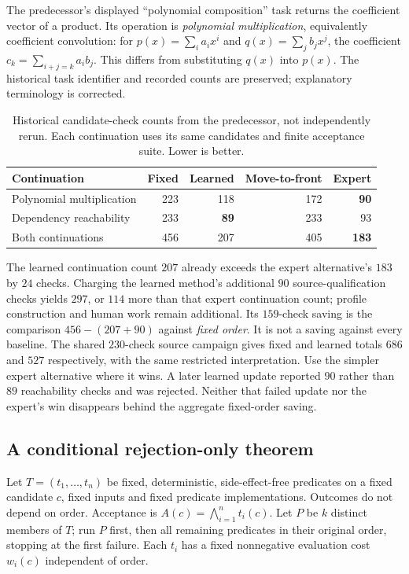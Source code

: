 \documentclass[11pt,letterpaper]{article}
\begin{document}
The predecessor's displayed ``polynomial composition'' task returns the coefficient vector of a product. Its operation is \emph{polynomial multiplication}, equivalently coefficient convolution: for $p(x)=\sum_i a_i x^i$ and $q(x)=\sum_j b_jx^j$, the coefficient $c_k=\sum_{i+j=k}a_i b_j$. This differs from substituting $q(x)$ into $p(x)$. The historical task identifier and recorded counts are preserved; explanatory terminology is corrected.

\begin{table}[htbp]\centering\small
\caption{Historical candidate-check counts from the predecessor, not independently rerun. Each continuation uses its same candidates and finite acceptance suite. Lower is better.}
\begin{tabularx}{\linewidth}{@{}Xrrrr@{}}\toprule
Continuation & Fixed & Learned & Move-to-front & Expert\\\midrule
Polynomial multiplication & 223 & 118 & 172 & \textbf{90}\\
Dependency reachability & 233 & \textbf{89} & 233 & 93\\\midrule
Both continuations & 456 & 207 & 405 & \textbf{183}\\\bottomrule
\end{tabularx}
\end{table}
The learned continuation count $207$ already exceeds the expert alternative's $183$ by $24$ checks. Charging the learned method's additional $90$ source-qualification checks yields $297$, or $114$ more than that expert continuation count; profile construction and human work remain additional. Its $159$-check saving is the comparison $456-(207+90)$ against \emph{fixed order}. It is not a saving against every baseline. The shared $230$-check source campaign gives fixed and learned totals $686$ and $527$ respectively, with the same restricted interpretation. Use the simpler expert alternative where it wins. A later learned update reported $90$ rather than $89$ reachability checks and was rejected. Neither that failed update nor the expert's win disappears behind the aggregate fixed-order saving.

\subsection{A conditional rejection-only theorem}
Let $T=(t_1,\ldots,t_n)$ be fixed, deterministic, side-effect-free predicates on a fixed candidate $c$, fixed inputs and fixed predicate implementations. Outcomes do not depend on order. Acceptance is $A(c)=\bigwedge_{i=1}^{n}t_i(c)$. Let $P$ be $k$ distinct members of $T$; run $P$ first, then all remaining predicates in their original order, stopping at the first failure. Each $t_i$ has a fixed nonnegative evaluation cost $w_i(c)$ independent of order.
\end{document}
